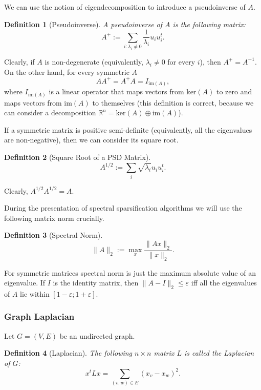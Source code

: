 \documentclass[12pt]{article}
\newcommand{\eps}{\varepsilon}
\newtheorem{definition}{Definition}
\begin{document}
    We can use the notion of eigendecomposition to introduce a pseudoinverse of $A$.

    \begin{definition}[Pseudoinverse]
        A \emph{pseudoinverse} of $A$ is the following matrix:
        $$
            A^+ := \sum_{i : \lambda_i \ne 0} \frac{1}{\lambda_i} u_i u_i^t.
        $$
    \end{definition}

    Clearly, if $A$ is non-degenerate (equivalently, $\lambda_i \ne 0$ for every $i$),
    then $A^+ = A^{-1}$.
    On the other hand, for every symmetric $A$
    $$
        A A^+ = A^+ A = I_{\mathrm{im}(A)},
    $$
    where $I_{\mathrm{im}(A)}$ is a linear operator that maps vectors from $\mathrm{ker}(A)$
    to zero and maps vectors from $\mathrm{im}(A)$ to themselves (this definition is correct,
    because we can consider a decomposition
    $\mathbb{R}^n = \mathrm{ker}(A) \oplus \mathrm{im}(A)$).

    If a symmetric matrix is positive semi-definite (equivalently, all the eigenvalues
    are non-negative), then we can consider its square root.

    \begin{definition}[Square Root of a PSD Matrix]
        $$
            A^{1/2} := \sum_{i} \sqrt{\lambda_i} u_i u_i^t.
        $$
    \end{definition}
    Clearly, $A^{1/2} A^{1/2} = A$.

    During the presentation of spectral sparsification algorithms we will use the following
    matrix norm crucially.

    \begin{definition}[Spectral Norm]
        $$
            \|A\|_2 := \max_{x} \frac{\|Ax\|_2}{\|x\|_2}.
        $$
    \end{definition}

    For symmetric matrices spectral norm is just the maximum absolute value of an eigenvalue.
    If $I$ is the identity matrix, then $\|A - I\|_2 \leq \eps$ iff all the eigenvalues of
    $A$ lie within $[1 - \eps; 1 + \eps]$.

    \subsubsection{Graph Laplacian}

    Let $G = (V, E)$ be an undirected graph.

    \begin{definition}[Laplacian]
        The following $n \times n$ matrix $L$ is called the Laplacian of $G$:
        $$
            x^t L x = \sum_{(v,w) \in E} (x_v - x_w)^2. 
        $$
    \end{definition}
\end{document}
